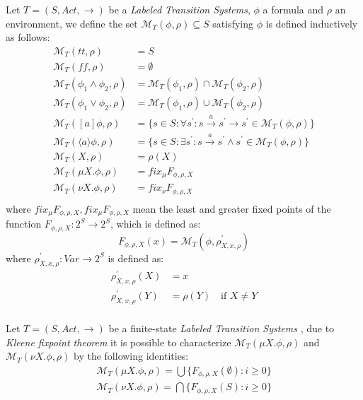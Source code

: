 Let $T = (S, Act, \rightarrow)$ be a \emph{Labeled Transition
  Systems}, $\phi$ a formula and $\rho$ an environment, we define the
set $\mathcal{M}_T(\phi, \rho) \subseteq S$ satisfying $\phi$ is
defined inductively as follows:
\begin{displaymath}
  \begin{split}
    \mathcal{M}_T(tt, \rho) &= S \\
    \mathcal{M}_T(ff, \rho) &= \emptyset \\
    \mathcal{M}_T(\phi_1 \wedge \phi_2, \rho) &=
    \mathcal{M}_T(\phi_1, \rho) \cap     \mathcal{M}_T(\phi_2, \rho)\\
    \mathcal{M}_T(\phi_1 \vee \phi_2, \rho) &=
    \mathcal{M}_T(\phi_1, \rho) \cup     \mathcal{M}_T(\phi_2, \rho)\\
    \mathcal{M}_T([a]\phi, \rho) &= \{ s\in S: \forall s^{\prime}: s
    \xrightarrow{a} s^{\prime} \rightarrow s^{\prime} \in
    \mathcal{M}_T(\phi, \rho)\} \\
    \mathcal{M}_T(\langle a \rangle \phi, \rho) &= \{ s\in S: \exists
    s^{\prime}: s \xrightarrow{a} s^{\prime} \wedge s^{\prime} \in
    \mathcal{M}_T(\phi, \rho)\} \\
    \mathcal{M}_T(X, \rho) &= \rho(X) \\
    \mathcal{M}_T(\mu X.\phi, \rho) &= fix_{\mu}F_{\phi, \rho, X} \\
    \mathcal{M}_T(\nu X.\phi, \rho) &= fix_{\nu}F_{\phi, \rho, X} \\
  \end{split}
\end{displaymath}
where $fix_{\mu}F_{\phi, \rho, X}, fix_{\mu}F_{\phi, \rho, X}$ mean
the least and greater fixed points of the function $F_{\phi, \rho, X}:
2^S \rightarrow 2^S$, which is defined as:
\begin{displaymath}
  F_{\phi, \rho, X}(x) = \mathcal{M}_T(\phi, \rho_{X, x, \rho}^{\prime})
\end{displaymath}
where $\rho_{X, x, \rho}^{\prime}: Var \rightarrow 2^S$ is defined as:
\begin{displaymath}
  \begin{split}
    \rho_{X, x, \rho}^{\prime}(X) &= x \\
    \rho_{X, x, \rho}^{\prime}(Y) &= \rho(Y) \quad \text{if } X\not=Y\\
  \end{split}
\end{displaymath}

Let $T = (S, Act, \rightarrow)$ be a finite-state \emph{Labeled
  Transition Systems} , due to \emph{Kleene fixpoint theorem} it is
possible to characterize $ \mathcal{M}_T(\mu X.\phi, \rho)$ and $
\mathcal{M}_T(\nu X.\phi, \rho)$ by the following identities:
\begin{displaymath}
  \begin{split}
    \mathcal{M}_T(\mu X.\phi, \rho) = \bigcup \{F_{\phi, \rho,
      X}(\emptyset):i\geq 0\} \\
    \mathcal{M}_T(\nu X.\phi, \rho) = \bigcap \{F_{\phi, \rho,
      X}(S):i\geq 0\} \\
  \end{split}
\end{displaymath}

